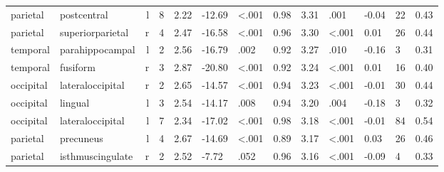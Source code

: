 \documentclass{article}
\begin{document}
\begin{longtable}{llrR{1.3cm}R{1cm}R{1.3cm}R{1cm}R{1cm}R{1.3cm}R{1cm}R{1.8cm}R{1.3cm}R{1.8cm}}
  parietal &               postcentral &    l &         8 &                  2.22 &           -12.69 &      \textless.001 &                               0.98 &                          3.31 &                            .001 &  -0.04 &     22 &      0.43 \\
  parietal &          superiorparietal &    r &         4 &                  2.47 &           -16.58 &      \textless.001 &                               0.96 &                          3.30 &                   \textless.001 &   0.01 &     26 &      0.44 \\
  temporal &           parahippocampal &    l &         2 &                  2.56 &           -16.79 &               .002 &                               0.92 &                          3.27 &                            .010 &  -0.16 &      3 &      0.31 \\
  temporal &                  fusiform &    r &         3 &                  2.87 &           -20.80 &      \textless.001 &                               0.92 &                          3.24 &                   \textless.001 &   0.01 &     16 &      0.40 \\
 occipital &          lateraloccipital &    r &         2 &                  2.65 &           -14.57 &      \textless.001 &                               0.94 &                          3.23 &                   \textless.001 &  -0.01 &     30 &      0.44 \\
 occipital &                   lingual &    l &         3 &                  2.54 &           -14.17 &               .008 &                               0.94 &                          3.20 &                            .004 &  -0.18 &      3 &      0.32 \\
 occipital &          lateraloccipital &    l &         7 &                  2.34 &           -17.02 &      \textless.001 &                               0.98 &                          3.18 &                   \textless.001 &  -0.01 &     84 &      0.54 \\
  parietal &                 precuneus &    l &         4 &                  2.67 &           -14.69 &      \textless.001 &                               0.89 &                          3.17 &                   \textless.001 &   0.03 &     26 &      0.46 \\
  parietal &          isthmuscingulate &    r &         2 &                  2.52 &            -7.72 &               .052 &                               0.96 &                          3.16 &                   \textless.001 &  -0.09 &      4 &      0.33 \\

\end{longtable}
\end{document}
